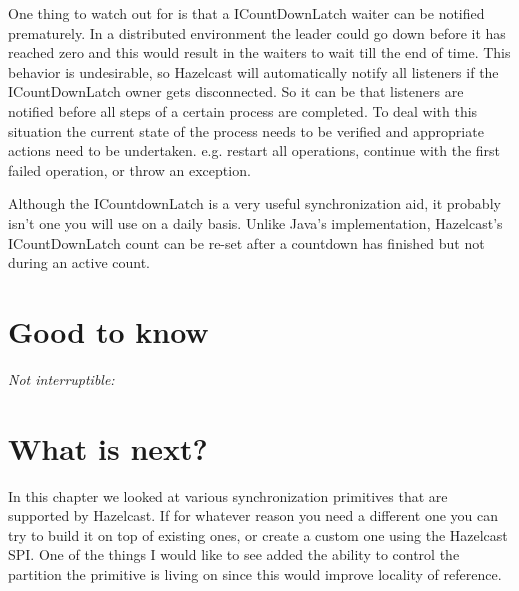 One thing to watch out for is that a ICountDownLatch waiter can be notified prematurely. In a distributed environment the leader could go down before it has reached zero and this would result in the waiters to wait till the end of time. This behavior is undesirable, so Hazelcast will automatically notify all listeners if the ICountDownLatch owner gets disconnected. So it can be that listeners are notified before all steps of a certain process are completed. To deal with this situation the current state of the process needs to be verified and appropriate actions need to be undertaken. e.g. restart all operations, continue with the first failed operation, or throw an exception.

Although the ICountdownLatch is a very useful synchronization aid, it probably isn't one you will use on a daily basis. Unlike Java's implementation, Hazelcast's ICountDownLatch count can be re-set after a countdown has finished but not during an active count. 

\section{Good to know}

\emph{Not interruptible:}

\section{What is next?}
In this chapter we looked at various synchronization primitives that are supported by Hazelcast. If for whatever reason you need a different one you can try to build it on top of existing ones, or create a custom one using the Hazelcast SPI. One of the things I would like to see added the ability to control the partition the primitive is living on since this would improve locality of reference. 
